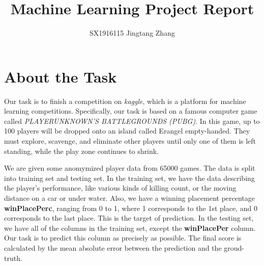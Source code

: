 \documentclass[journal=jacsat,manuscript=article]{achemso}
\author{SX1916115 Jingtang Zhang}
\title[An \textsf{achemso} demo]
  {Machine Learning Project Report}
\begin{document}


\section{About the Task}

Our task is to finish a competition on \emph{kaggle}, which is a platform
for machine learning competitions. Specifically, our task is based on a
famous computer game called \emph{PLAYERUNKNOWN’S BATTLEGROUNDS (PUBG)}.
In this game, up to 100 players will be dropped onto an island called Erangel
empty-handed. They must explore, scavenge, and eliminate other players until
only one of them is left standing, while the play zone continues to
shrink.

We are given some anomymized player data from 65000 games. The data is split
into training set and testing set. In the training set, we have the data
describing the player's performance, like various kinds of killing count, or the
moving distance on a car or under water. Also, we have a winning placement
percentage \textbf{winPlacePerc}, ranging from 0 to 1, where 1 corresponds to the
1st place, and 0 corresponds to the last place. This is the target of
prediction. In the testing set, we have all of the columns in the training
set, except the \textbf{winPlacePer} column. Our task is to predict this column
as precisely as possible. The final score is calculated by the mean absolute error
between the prediction and the groud-truth.
\end{document}
